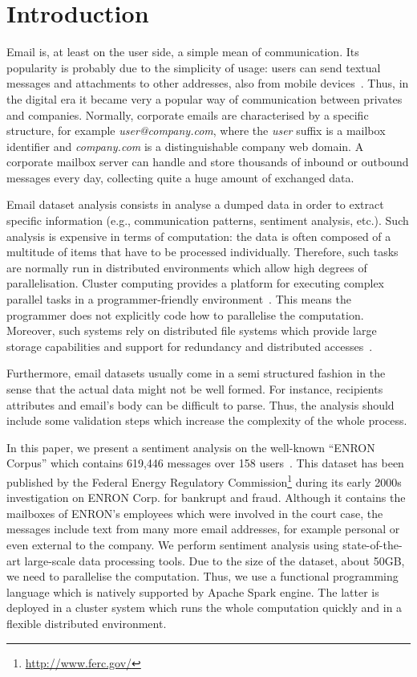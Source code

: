 \documentclass{vldb}
\begin{document}
\section{Introduction}
Email is, at least on the user side, a simple mean of communication.
Its popularity is probably due to the simplicity of usage: users can send textual messages and attachments to other addresses, also from mobile devices~\cite{chen2002enterprise}.   
Thus, in the digital era it became very a popular way of communication between privates and companies.
Normally, corporate emails are characterised by a specific structure, for example \textit{user@company.com}, where the \textit{user} suffix is a mailbox identifier and \textit{company.com} is a distinguishable company web domain.
A corporate mailbox server can handle and store thousands of inbound or outbound messages every day, collecting quite a huge amount of exchanged data.

Email dataset analysis consists in analyse a dumped data in order to extract specific information (e.g., communication patterns, sentiment analysis, etc.).
Such analysis is expensive in terms of computation: the data is often composed of a multitude of items that have to be processed individually.
Therefore, such tasks are normally run in distributed environments which allow high degrees of parallelisation.
Cluster computing provides a platform for executing complex parallel tasks in a programmer-friendly environment~\cite{buyya1999high, zaharia2010spark, shvachko2010hadoop}.
This means the programmer does not explicitly code how to parallelise the computation.
Moreover, such systems rely on distributed file systems which provide large storage capabilities and support for redundancy and distributed accesses~\cite{weil2006ceph}.

Furthermore, email datasets usually come in a semi structured fashion in the sense that the actual data might not be well formed. 
For instance, recipients attributes and email's body can be difficult to parse.
Thus, the analysis should include some validation steps which increase the complexity of the whole process.

In this paper, we present a sentiment analysis on the well-known ``ENRON Corpus'' which contains 619,446 messages over 158 users~\cite{shetty2004enron}.
This dataset has been published by the Federal Energy Regulatory Commission\footnote{\url{http://www.ferc.gov/}} during its early 2000s investigation on ENRON Corp. for bankrupt and fraud.
Although it contains the mailboxes of ENRON's employees which were involved in the court case, the messages include text from many more email addresses, for example personal or even external to the company.
We perform sentiment analysis using state-of-the-art large-scale data processing tools.
Due to the size of the dataset, about 50GB, we need to parallelise the computation.
Thus, we use a functional programming language which is natively supported by Apache Spark engine.
The latter is deployed in a cluster system which runs the whole computation quickly and in a flexible distributed environment.
\end{document}
